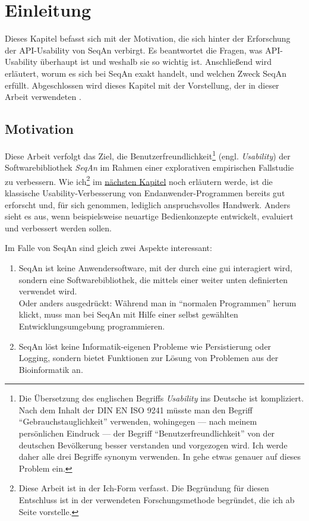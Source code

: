 \glsresetall

\chapter{Einleitung}

Dieses Kapitel befasst sich mit der Motivation, die sich hinter der Erforschung der API-Usability von SeqAn verbirgt. Es beantwortet die Fragen, was API-Usability überhaupt ist und weshalb sie so wichtig ist. Anschließend wird erläutert, worum es sich bei SeqAn exakt handelt, und welchen Zweck SeqAn erfüllt. Abgeschlossen wird dieses Kapitel mit der Vorstellung, der in dieser Arbeit verwendeten .



\section{Motivation}
\label{sec:motivation}

Diese Arbeit verfolgt das Ziel, die Benutzerfreundlichkeit\footnote{Die Übersetzung des englischen Begriffs \textit{Usability} ins Deutsche ist kompliziert. Nach dem Inhalt der DIN EN ISO 9241 müsste man den Begriff ``Gebrauchstauglichkeit'' verwenden, wohingegen --- nach meinem persönlichen Eindruck --- der Begriff ``Benutzerfreundlichkeit'' von der deutschen Bevölkerung besser verstanden und vorgezogen wird. Ich werde daher alle drei Begriffe synonym verwenden. In  gehe etwas genauer auf dieses Problem ein.} (engl. \textit{Usability}) der Softwarebibliothek \textit{SeqAn} im Rahmen einer explorativen empirischen Fallstudie zu verbessern. Wie ich\footnote{Diese Arbeit ist in der Ich-Form verfasst. Die Begründung für diesen Entschluss ist in der verwendeten Forschungsmethode begründet, die ich ab Seite \pageref{sec:gtm} vorstelle.} im \hyperref[sec:forschungsstand]{nächsten Kapitel} noch erläutern werde, ist die klassische Usability-Verbesserung von Endanwender-Programmen bereits gut erforscht und, für sich genommen, lediglich anspruchsvolles Handwerk. Anders sieht es aus, wenn beispielsweise neuartige Bedienkonzepte entwickelt, evaluiert und verbessert werden sollen.

Im Falle von SeqAn sind gleich zwei Aspekte interessant:
\begin{enumerate}
  \item SeqAn ist keine Anwendersoftware, mit der durch eine \gls{gui} interagiert wird, sondern eine Softwarebibliothek, die mittels einer weiter unten definierten  verwendet wird.
      \\Oder anders ausgedrückt: Während man in ``normalen Programmen'' herum klickt, muss man bei SeqAn mit Hilfe einer selbst gewählten Entwicklungsumgebung programmieren.
  \item SeqAn löst keine Informatik-eigenen Probleme wie Persistierung oder Logging, sondern bietet Funktionen zur Lösung von Problemen aus der Bioinformatik an. 
\end{enumerate}


